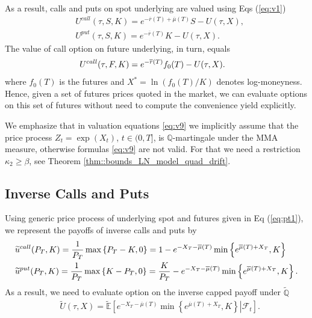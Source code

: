 \documentclass[pdftex,11pt,a4paper] {article}
\begin{document}
As a result, calls and puts on spot underlying are valued using Eqs (\ref{eq:v1})
\begin{equation} \label{eq:v9}
\begin{split}
  & U^{call}(\tau, S,K)  = e^{-\overline{r}(T)+\overline{\mu}(T)}S- U(\tau, X), \\
	& U^{put}(\tau, S,K)  = e^{-\overline{r}(T)} K - U(\tau, X).
\end{split} 
\end{equation}
The value of call option on future underlying, in turn, equals
\begin{equation} \label{eq:v9a}
\begin{split}
  & U^{call}(\tau, F,K) =  e^{-\overline{r}(T)}f_{0}(T)- U(\tau, X).\vspace*{-1.0\baselineskip}
\end{split} 
\end{equation}
where $f_{0}(T)$ is the futures and $X^{*}=\ln(f_{0}(T)/K)$ denotes log-moneyness. Hence, given a set of futures prices quoted in the market, we can evaluate options on this set of futures without need to compute the convenience yield explicitly.

We emphasize that in valuation equations \eqref{eq:v9} we implicitly assume that the price process $Z_t=\exp(X_t)$, $t \in (0, T]$, is $\mathbb{Q}$-martingale under the MMA measure, otherwise formulas \eqref{eq:v9} are not valid. For that we need a restriction $\kappa_2\ge \beta$, see Theorem \ref{thm::bounds_LN_model_quad_drift}. 


\subsection{Inverse Calls and Puts}

Using generic price process of underlying spot and futures given in Eq (\ref{eq:pt1}), we represent the payoffs of inverse calls and puts by
\begin{equation}\label{eq:io1}
\begin{split}
  & \widetilde{u}^{call}(P_{T},K) = \frac{1}{P_{T}}\max\left\{P_{T}-K, 0\right\}=1-e^{-X_{T}-\overline{\mu}(T)}\min\left\{e^{\overline{\mu}(T)+X_{T}},K\right\}\\
	& \widetilde{u}^{put}(P_{T},K) = \frac{1}{P_{T}}\max\left\{K-P_T, 0\right\} = \frac{K}{P_{T}}  - e^{-X_{T}-\overline{\mu}(T)}\min\left\{e^{\overline{\mu}(T)+X_{T}},K\right\}.\vspace*{-1.0\baselineskip}
\end{split} 
\end{equation}
As a result, we need to evaluate option on the inverse capped payoff under $\tilde{\mathbb{Q}}$
\begin{equation} \label{eq:io2}
\begin{split}
  & \tilde{U}(\tau, X) = \tilde{\mathbb{E}}\left[\left.e^{-X_{T}-\overline{\mu}(T)} \min\left\{e^{\overline{\mu}(T)+X_{T}},K\right\}\right|\mathcal{F}_{t}\right].
\end{split} 
\end{equation}
\end{document}
